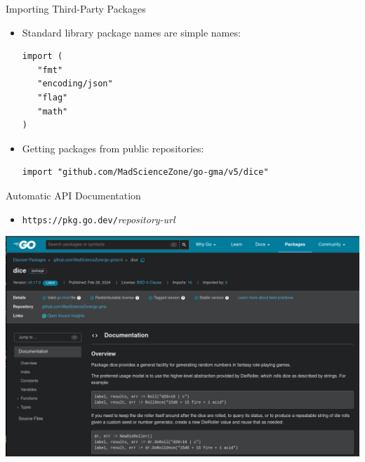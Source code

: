 \documentclass[pdf]{beamer}
\newcommand\go[1]{\texttt{#1}}
\begin{document}
\begin{frame}[fragile]{Importing Third-Party Packages}
	\begin{itemize}
		\item Standard library package names are simple names:
\begin{lstlisting}
import (
   "fmt"
   "encoding/json"
   "flag"
   "math"
)
\end{lstlisting}
\pause
		\item Getting packages from public repositories:
			\pause
\begin{lstlisting}
import "github.com/MadScienceZone/go-gma/v5/dice"
\end{lstlisting}
	\end{itemize}
	\vfill
	\strut
\end{frame}
\begin{frame}{Automatic API Documentation}
\begin{itemize}
\item\go{https://pkg.go.dev/}\emph{repository-url}
\end{itemize}
	\begin{center}
		\includegraphics[width=\textwidth]{docsite}
	\end{center}
\end{frame}
\end{document}
